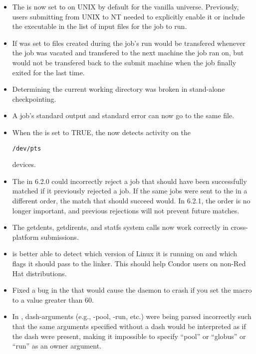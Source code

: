 \begin{itemize}
\item The  is now set to 
on UNIX by default for the vanilla universe. Previously, users submitting
from UNIX to NT needed to explicitly enable it or include the executable in
the list of input files for the job to run.

\item If  was set to 
files created during the job's run would be transfered whenever the job was 
vacated and transfered to the next machine the job ran on, but would not be
transfered back to the submit machine when the job finally exited for the last time.

\item Determining the current working directory was broken in stand-alone
checkpointing. 

\item A job's standard output and standard error can now go to the same file.

\item When the  is set to TRUE, the
 now detects activity on the 
\begin{verbatim}/dev/pts\end{verbatim} devices.  

\item The  in 6.2.0 could incorrectly reject a job
that should have been successfully matched if it previously rejected a 
job. If the same jobs were sent to the  in a different
order, the match that should succeed would. In 6.2.1, the order is no longer
important, and previous rejections will not prevent future matches.

\item The getdents, getdirents, and statfs system calls now work correctly in 
cross-platform submissions.

\item {} is better able to detect which version of Linux
it is running on and which flags it should pass to the linker. This should
help Condor users on non-Red Hat distributions.

\item Fixed a bug in the  that would cause the daemon
to crash if you set the  macro to a value
greater than 60.

\item In , dash-arguments (e.g., -pool, -run, etc.) were being
parsed incorrectly such that the same arguments specified without a
dash would be interpreted as if the dash were present, making it
impossible to specify ``pool'' or ``globus'' or ``run'' as an owner
argument.


\end{itemize}
